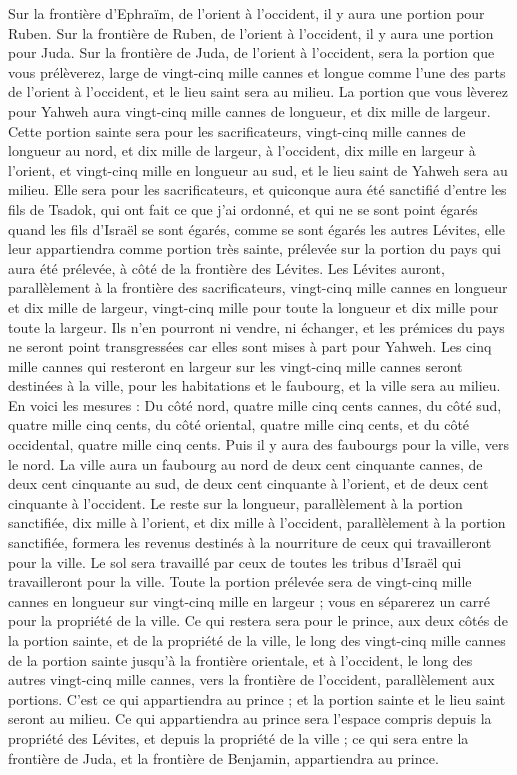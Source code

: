 \begin{multicols}{2}
Sur la frontière d'Ephraïm, de l’orient à l’occident, il y aura une portion pour Ruben.
Sur la frontière de Ruben, de l’orient à l'occident, il y aura une portion pour Juda.
Sur la frontière de Juda, de l’orient à l’occident, sera la portion que vous prélèverez, large de vingt-cinq mille cannes et longue comme l’une des parts de l’orient à l’occident, et le lieu saint sera au milieu.
La portion que vous lèverez pour Yahweh aura vingt-cinq mille cannes de longueur, et dix mille de largeur.
Cette portion sainte sera  pour les sacrificateurs, vingt-cinq mille cannes de longueur au nord, et dix mille de largeur, à l’occident, dix mille en largeur à l’orient, et vingt-cinq mille en longueur au sud, et le lieu saint de Yahweh sera au milieu.
Elle sera pour les sacrificateurs, et quiconque aura été sanctifié d'entre les fils de Tsadok, qui ont fait ce que j'ai ordonné, et qui ne se sont point égarés quand les fils d'Israël se sont égarés, comme se sont égarés les autres Lévites,
elle leur appartiendra comme portion très sainte, prélevée sur la portion du pays qui aura été prélevée, à côté de la frontière des Lévites.
Les Lévites auront, parallèlement à la frontière des sacrificateurs, vingt-cinq mille cannes en longueur et dix mille de largeur, vingt-cinq mille pour toute la longueur et dix mille pour toute la largeur.
Ils n’en pourront ni vendre, ni échanger, et les prémices du pays ne seront point transgressées car elles sont mises à part pour Yahweh.
Les cinq mille cannes qui resteront en largeur sur les vingt-cinq mille cannes seront destinées à la ville, pour les habitations et le faubourg, et la ville sera au milieu.
En voici les mesures : Du côté nord, quatre mille cinq cents cannes, du côté sud, quatre mille cinq cents, du côté oriental, quatre mille cinq cents, et du côté occidental, quatre mille cinq cents.
Puis il y aura des faubourgs pour la ville, vers le nord. La ville aura un faubourg au nord de deux cent cinquante cannes, de deux cent cinquante au sud, de deux cent cinquante à l’orient, et de deux cent cinquante à l’occident.
Le  reste sur la longueur, parallèlement à la portion sanctifiée, dix mille à l'orient, et dix mille à l’occident, parallèlement à la portion sanctifiée, formera les revenus destinés à la nourriture de ceux qui travailleront pour la ville.
Le sol sera travaillé par ceux de toutes les tribus d'Israël qui travailleront pour la ville.
Toute la portion prélevée sera de vingt-cinq mille cannes en longueur sur vingt-cinq mille en largeur ; vous en séparerez un carré pour la propriété de la ville.
Ce qui restera sera pour le prince, aux deux côtés de la portion sainte, et de la propriété de la ville, le long des vingt-cinq mille cannes de la portion sainte jusqu’à la  frontière orientale, et à l'occident, le long des autres vingt-cinq mille cannes, vers la frontière de l'occident, parallèlement aux portions. C’est ce qui appartiendra au prince ; et la portion sainte et le lieu saint seront au milieu.
Ce qui appartiendra au prince sera l’espace compris depuis la propriété des Lévites, et depuis la propriété de la ville ; ce qui sera entre la frontière de Juda, et la frontière de Benjamin, appartiendra au prince.
\PPE{}
\end{multicols}
